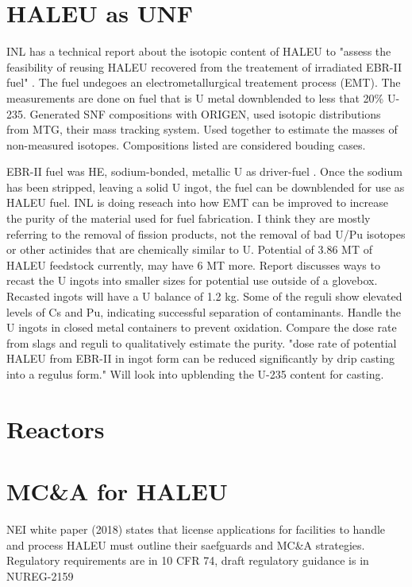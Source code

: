 \documentclass{article}
\begin{document}
\section{HALEU as UNF}
INL has a technical report about the isotopic content of HALEU to 
"assess the feasibility of reusing HALEU recovered from the treatement 
of irradiated EBR-II fuel" \cite{vaden_isotopic_2018}. The fuel undegoes 
an electrometallurgical treatement process (EMT). The measurements
are done on fuel that is U metal downblended to less that 20\% U-235.
Generated SNF compositions with ORIGEN, used isotopic distributions from 
MTG, their mass tracking system. Used together to estimate the masses of 
non-measured isotopes. Compositions listed are considered bouding cases. 

EBR-II fuel was HE, sodium-bonded, metallic U as driver-fuel 
\cite{patterson_haleu_2019}. Once the sodium has been stripped, leaving 
a solid U ingot, the fuel can be downblended for use as HALEU fuel.
INL is doing reseach into how EMT can be improved to increase the purity 
of the material used for fuel fabrication. I think they are mostly 
referring to the removal of fission products, not the removal of bad 
U/Pu isotopes or other actinides that are chemically similar to U. 
Potential of 3.86 MT of HALEU feedstock currently, may have 6 MT more. 
Report discusses ways to recast the U ingots into smaller sizes for 
potential use outside of a glovebox. Recasted ingots will have a U 
balance of 1.2 kg. Some of the reguli show elevated levels of Cs and 
Pu, indicating successful separation of contaminants. Handle the U 
ingots in closed metal containers to prevent oxidation. Compare the dose 
rate from slags and reguli to qualitatively estimate the purity.
"dose rate of potential HALEU from EBR-II in ingot form can be reduced 
significantly by drip casting into a regulus form." Will look into 
upblending the U-235 content for casting. 

\section{Reactors}

\section{MC\&A for HALEU}
NEI white paper (2018) states that license applications for facilities
to handle and process HALEU must outline their saefguards and MC\&A 
strategies. Regulatory requirements are in 10 CFR 74, draft regulatory 
guidance is in NUREG-2159



\end{document}

